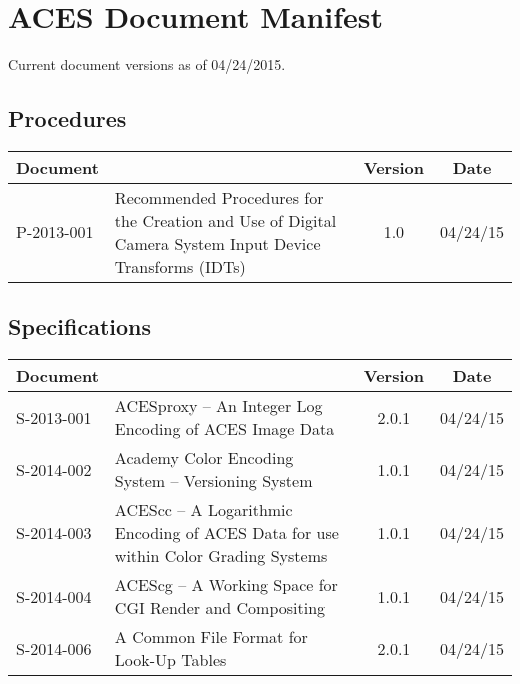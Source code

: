 \documentclass[10pt]{academydoc}
\begin{document}
\regularsectionformat

\section*{ACES Document Manifest}
Current document versions as of 04/24/2015.

\subsection*{Procedures}
\begin{tabularx}{\linewidth}{|l X|c|c|}
\hline
\textbf{Document} & & \textbf{Version} & \textbf{Date} \\ \hline
P-2013-001 & Recommended Procedures for the Creation and Use of Digital Camera System Input Device Transforms (IDTs) & 1.0 & 04/24/15 \\ \hline
\end{tabularx}

\subsection*{Specifications}
\begin{tabularx}{\linewidth}{|l X|c|c|}
\hline
\textbf{Document} & & \textbf{Version} & \textbf{Date} \\ \hline
S-2013-001 & ACESproxy -- An Integer Log Encoding of ACES Image Data & 2.0.1 & 04/24/15 \\ \hline
S-2014-002 & Academy Color Encoding System -- Versioning System & 1.0.1 & 04/24/15 \\ \hline
S-2014-003 & ACEScc -- A Logarithmic Encoding of ACES Data for use within Color Grading Systems & 1.0.1 & 04/24/15 \\ \hline
S-2014-004 & ACEScg -- A Working Space for CGI Render and Compositing & 1.0.1 & 04/24/15 \\ \hline
S-2014-006 & A Common File Format for Look-Up Tables & 2.0.1 & 04/24/15 \\ \hline
\end{tabularx}
\end{document}

